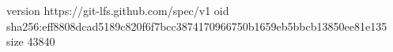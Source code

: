 version https://git-lfs.github.com/spec/v1
oid sha256:eff8808dcad5189c820f6f7bcc3874170966750b1659eb5bbcb13850ee81e135
size 43840

